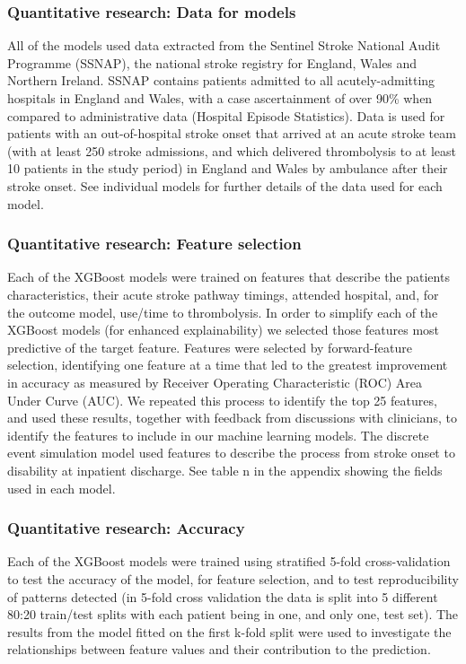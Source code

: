 \subsubsection{Quantitative research: Data for models}

All of the models used data extracted from the Sentinel Stroke National Audit Programme (SSNAP), the national stroke registry for England, Wales and Northern Ireland. SSNAP contains patients admitted to all acutely-admitting hospitals in England and Wales, with a case ascertainment of over 90\% when compared to administrative data (Hospital Episode Statistics). Data is used for patients with an out-of-hospital stroke onset that arrived at an acute stroke team (with at least 250 stroke admissions, and which delivered thrombolysis to at least 10 patients in the study period) in England and Wales by ambulance after their stroke onset. See individual models for further details of the data used for each model.

\subsubsection{Quantitative research: Feature selection}

Each of the XGBoost models were trained on features that describe the patients characteristics, their acute stroke pathway timings, attended hospital, and, for the outcome model, use/time to thrombolysis. In order to simplify each of the XGBoost models (for enhanced explainability) we selected those features most predictive of the target feature. Features were selected by forward-feature selection, identifying one feature at a time that led to the greatest improvement in accuracy as measured by Receiver Operating Characteristic (ROC) Area Under Curve (AUC). We repeated this process to identify the top 25 features, and used these results, together with feedback from discussions with clinicians, to identify the features to include in our machine learning models. The discrete event simulation model used features to describe the process from stroke onset to disability at inpatient discharge. See table n in the appendix showing the fields used in each model.

\subsubsection{Quantitative research: Accuracy}

Each of the XGBoost models were trained using stratified 5-fold cross-validation to test the accuracy of the model, for feature selection, and to test reproducibility of patterns detected (in 5-fold cross validation the data is split into 5 different 80:20 train/test splits with each patient being in one, and only one, test set). The results from the model fitted on the first k-fold split were used to investigate the relationships between feature values and their contribution to the prediction.

